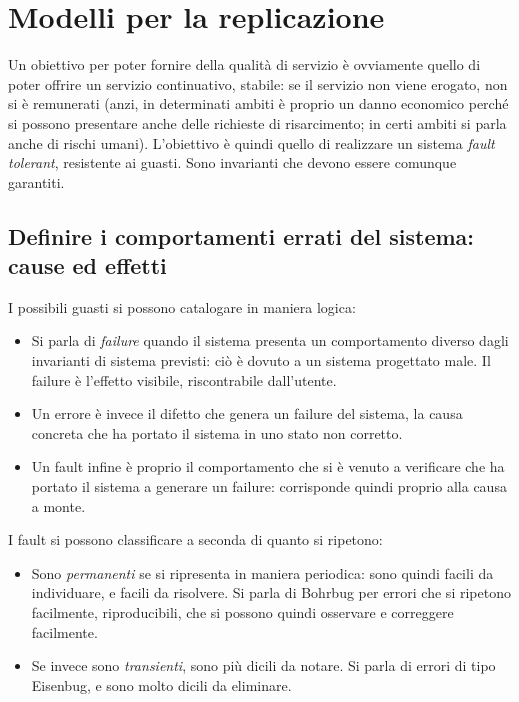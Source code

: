\section{Modelli per la replicazione}
Un obiettivo per poter fornire della qualità di servizio è ovviamente quello di poter offrire un servizio continuativo,
stabile: se il servizio non viene erogato, non si è remunerati (anzi, in determinati ambiti è proprio un danno economico
perché si possono presentare anche delle richieste di risarcimento; in certi ambiti si parla anche di rischi umani).
L'obiettivo è quindi quello di realizzare un sistema \textit{fault tolerant}, resistente ai guasti. Sono invarianti che
devono essere comunque garantiti.
\subsection{Definire i comportamenti errati del sistema: cause ed effetti}
I possibili guasti si possono catalogare in maniera logica:
\begin{itemize}
 \item Si parla di \textit{failure} quando il sistema presenta un comportamento diverso dagli invarianti di sistema
previsti: ciò è dovuto a un sistema progettato male. Il failure è l'effetto visibile, riscontrabile dall'utente.
 \item Un errore è invece il difetto che genera un failure del sistema, la causa concreta che ha portato il sistema 
 in uno stato non corretto.
 \item Un fault infine è proprio il comportamento che si è venuto a verificare che ha portato il sistema a generare un
 failure: corrisponde quindi proprio alla causa a monte.
\end{itemize}
I fault si possono classificare a seconda di quanto si ripetono:
\begin{itemize}
 \item Sono \textit{permanenti} se si ripresenta in maniera periodica: sono quindi facili da individuare, e facili da
 risolvere. Si parla di Bohrbug per errori che si ripetono facilmente, riproducibili, che si possono quindi osservare
 e correggere facilmente.
 \item Se invece sono \textit{transienti}, sono più dicili da notare. Si parla di errori di tipo Eisenbug, e sono molto
 dicili da eliminare.
\end{itemize}

